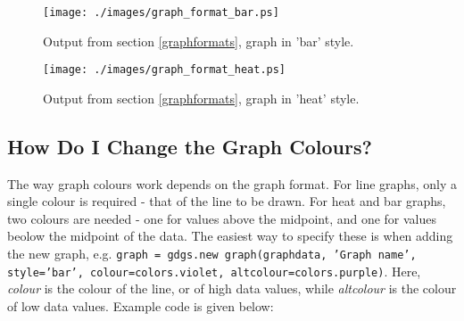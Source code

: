\documentclass{article}
\begin{document}
\begin{figure}[hptb]
  \texttt{[image: ./images/graph\_format\_bar.ps]}\\
  \caption{Output from section \ref{graphformats}, graph in 'bar' style.}
\label{graphformatsbarfig}
\end{figure}
\begin{figure}[hptb]
  \texttt{[image: ./images/graph\_format\_heat.ps]}\\
  \caption{Output from section \ref{graphformats}, graph in 'heat' style.}
\label{graphformatsheatfig}
\end{figure}


\subsection{How Do I Change the Graph Colours?}\label{graphcolours}
The way graph colours work depends on the graph format.  For line graphs, 
only a single colour is required - that of the line to be drawn.  For heat and 
bar graphs, two colours are needed - one for values above the midpoint, and 
one for values beolow the midpoint of the data.  The easiest way to specify 
these is when adding the new graph, e.g. \texttt{graph = gdgs.new\us 
graph(graphdata, 'Graph name', style='bar', colour=colors.violet, 
altcolour=colors.purple)}.  Here, \textit{colour} is the colour of the line, 
or of high data values, while \textit{altcolour} is the colour of low data 
values.
Example code is given below:
\end{document}
